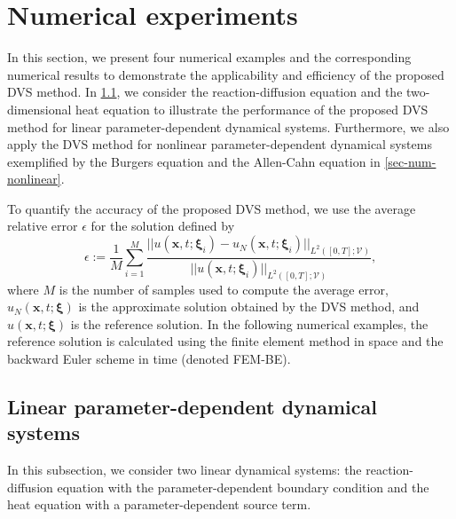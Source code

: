 \documentclass[10pt,a4paper]{article}
\numberwithin{equation}{section}
\numberwithin{lemma}{section}
\numberwithin{example}{section}
\numberwithin{definition}{section}
\numberwithin{assumption}{section}
\numberwithin{theorem}{section}
\numberwithin{proposition}{section}
\numberwithin{corollary}{section}
\numberwithin{remark}{section}
\begin{document}
 




\section{Numerical experiments}
\label{sec-numerical examples}
In this section, we present four numerical examples and the corresponding numerical results to demonstrate the applicability and efficiency of the proposed DVS method.
In \cref{sec-num-linear}, we consider the reaction-diffusion equation and the two-dimensional heat equation to illustrate the performance of the proposed DVS method
for linear parameter-dependent dynamical systems.
Furthermore, we also apply the DVS method for nonlinear parameter-dependent dynamical systems exemplified by the Burgers equation and the Allen-Cahn equation in \cref{sec-num-nonlinear}.
 
To quantify the accuracy of the proposed DVS method, we use the average relative error $\epsilon$ for the solution defined by 
\begin{equation}
\label{eq-meanerror}
\epsilon:=\frac{1}{M}\sum_{i=1}^{M}\frac{||u(\bm{x},t;\bm{\xi}_i)-u_{N}(\bm{x},t;\bm{\xi}_i)||_{L^2([0,T];\mathcal{V})}}{||u(\bm{x},t;\bm{\xi}_i)||_{L^2([0,T];\mathcal{V})}},
\end{equation}
where $M$ is the number of samples used to compute the average error, 
$u_{N}(\bm{x},t;\bm{\xi})$ is the approximate solution obtained by the DVS method, and $u(\bm{x},t;\bm{\xi})$ is the reference solution.
In the following numerical examples, the reference solution is calculated using the finite element method in space and the backward Euler scheme in time (denoted FEM-BE).  

\subsection{Linear parameter-dependent dynamical systems}
\label{sec-num-linear}
In this subsection, we consider two linear dynamical systems: the reaction-diffusion equation with the parameter-dependent boundary condition and the heat equation with a parameter-dependent source term.
 
\end{document}
